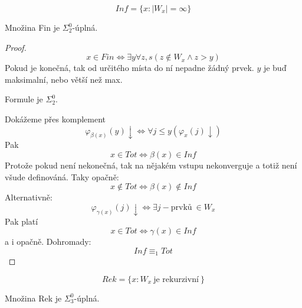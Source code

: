 \begin{definition}[Inf]
	\[ Inf = \{ x: |W_x| = \infty \} \]
\end{definition}

\begin{theorem}
	Množina Fin je $\Sigma_2^0$-úplná.
\end{theorem}
\begin{proof}
	\[ x \in Fin \iff \exists y \forall z, s (z \notin W_x \land z > y) \]
	Pokud je konečná, tak od určitého místa do ní nepadne žádný prvek.
	$y$ je buď maksimalní, nebo větší než max.

	Formule je $\Sigma_2^0$.

	Dokážeme přes komplement
	\[ \varphi_{\beta(x)}(y) \downarrow \iff \forall j \leq y (\varphi_x(j) \downarrow) \]
	Pak
	\[ x \in Tot \iff \beta(x) \in Inf \]
	Protože pokud není nekonečná, tak na nějakém vstupu nekonverguje a totiž není všude definováná.
	Taky opačně:
	\[ x \notin Tot \iff \beta(x) \notin Inf \]
	Alternativně:
	\[ \varphi_{\gamma(x)} (j) \downarrow \iff \exists j-\text{prvků}\ \in W_x \]
	Pak platí
	\[ x \in Tot \iff \gamma(x) \in Inf \]
	a i opačně.
	Dohromady:
	\[ Inf \equiv_1 Tot \]
\end{proof}

\begin{definition}[Rek]
	\[ Rek = \{ x: W_x\ \text{je rekurzivní}\ \} \]
\end{definition}

\begin{theorem}
	Množina Rek je $\Sigma_3^0$-úplná.
\end{theorem}
